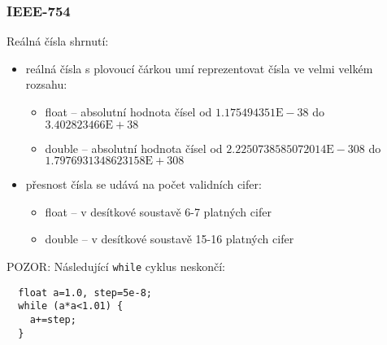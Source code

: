 \documentclass{beamer}
\begin{document}
\begin{frame}[fragile]
\frametitle{IEEE-754}

Reálná čísla shrnutí:
\begin{itemize}
\item reálná čísla s plovoucí čárkou umí reprezentovat čísla ve velmi velkém rozsahu:
\begin{itemize}
\item float -- absolutní hodnota čísel od $1.175494351\text{E}-38$ do $3.402823466\text{E} + 38$
\item double -- absolutní hodnota čísel od $2.2250738585072014\text{E} - 308$ do $1.7976931348623158\text{E} + 308$
\end{itemize}
\item přesnost čísla se udává na počet validních cifer:
\begin{itemize}
\item float -- v desítkové soustavě 6-7 platných cifer
\item double -- v desítkové soustavě 15-16 platných cifer
\end{itemize}
\end{itemize}

POZOR: Následující \texttt{while} cyklus neskončí:
\begin{verbatim}
  float a=1.0, step=5e-8;
  while (a*a<1.01) {
    a+=step;
  }
\end{verbatim}
\end{frame}
\end{document}
